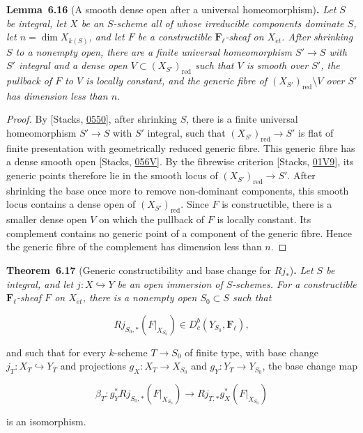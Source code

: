 \documentclass[11pt]{article}
\newenvironment{bpstatement}[2]{\par\addvspace{0.6\baselineskip}\noindent\textbf{#1}#2\textbf{.}\enspace\ignorespaces}
  {\par\addvspace{0.4\baselineskip}}
\newenvironment{bpstatementit}[2]{\begin{bpstatement}{#1}{#2}\itshape\ignorespaces}{\end{bpstatement}}
\providecommand{\Dbc}{}\renewcommand{\Dbc}{D^b_c}
\providecommand{\Fell}{}\renewcommand{\Fell}{\mathbf F_\ell}
\begin{document}
\label{bp49}%
\begin{bpstatementit}{Lemma~6.16}{ (A smooth dense open after a universal homeomorphism)}
Let \(S\) be integral, let \(X\) be an \(S\)-scheme all of whose irreducible components dominate \(S\), let \(n=\dim X_{k(S)}\), and let \(F\) be a constructible \(\Fell\)-sheaf on \(X_{\acute{e}t}\). After shrinking \(S\) to a nonempty open, there are a finite universal homeomorphism \(S'\to S\) with \(S'\) integral and a dense open \(V\subset(X_{S'})_{\mathrm{red}}\) such that \(V\) is smooth over \(S'\), the pullback of \(F\) to \(V\) is locally constant, and the generic fibre of \((X_{S'})_{\mathrm{red}}\setminus V\) over \(S'\) has dimension less than \(n\).
\end{bpstatementit}

\begin{proof}[{Proof}]\label{bp50}%
By [Stacks, \href{https://stacks.math.columbia.edu/tag/0550}{0550}], after shrinking \(S\), there is a finite universal homeomorphism \(S'\to S\) with \(S'\) integral, such that \((X_{S'})_{\mathrm{red}}\to S'\) is flat of finite presentation with geometrically reduced generic fibre. This generic fibre has a dense smooth open [Stacks, \href{https://stacks.math.columbia.edu/tag/056V}{056V}]. By the fibrewise criterion [Stacks, \href{https://stacks.math.columbia.edu/tag/01V9}{01V9}], its generic points therefore lie in the smooth locus of \((X_{S'})_{\mathrm{red}}\to S'\). After shrinking the base once more to remove non-dominant components, this smooth locus contains a dense open of \((X_{S'})_{\mathrm{red}}\). Since \(F\) is constructible, there is a smaller dense open \(V\) on which the pullback of \(F\) is locally constant. Its complement contains no generic point of a component of the generic fibre. Hence the generic fibre of the complement has dimension less than \(n\).
\end{proof}

\label{bp51}%
\begin{bpstatementit}{Theorem~6.17}{ (Generic constructibility and base change for $Rj_*$)}
Let \(S\) be integral, and let \(j:X\hookrightarrow Y\) be an open immersion of \(S\)-schemes. For a constructible \(\Fell\)-sheaf \(F\) on \(X_{\acute{e}t}\), there is a nonempty open \(S_0\subset S\) such that

\[
Rj_{S_0,*}(F|_{X_{S_0}})\in\Dbc(Y_{S_0},\Fell),
\tag{6.19}
\]

and such that for every \(k\)-scheme \(T\to S_0\) of finite type, with base change \(j_T:X_T\hookrightarrow Y_T\) and projections \(g_X:X_T\to X_{S_0}\) and \(g_Y:Y_T\to Y_{S_0}\), the base change map

\[
\beta_T:g_Y^*Rj_{S_0,*}(F|_{X_{S_0}})
\longrightarrow Rj_{T,*}g_X^*(F|_{X_{S_0}})
\tag{6.20}
\]

is an isomorphism.
\end{bpstatementit}
\end{document}

